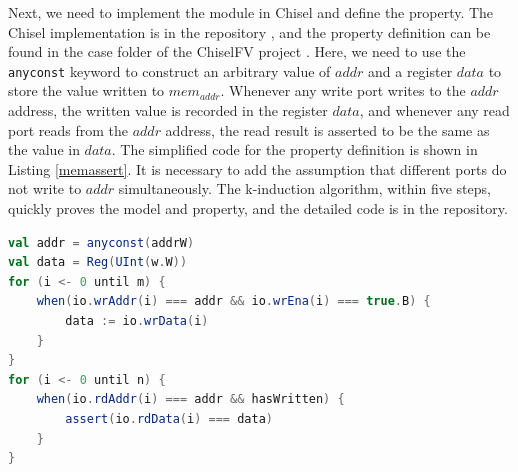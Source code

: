 \documentclass[conference]{IEEEtran}
\theoremstyle{definition}
\begin{document}
Next, we need to implement the module in Chisel and define the property. 
The Chisel implementation is in the repository \cite{mpMemory}, and the property definition can be found in the case folder of the ChiselFV project \cite{ChiselFV}.
Here, we need to use the \verb|anyconst| keyword to construct an arbitrary value of $addr$ and a register $data$ to store the value written to $mem_{addr}$. Whenever any write port writes to the $addr$ address, the written value is recorded in the register $data$, and whenever any read port reads from the $addr$ address, the read result is asserted to be the same as the value in $data$.
The simplified code for the property definition is shown in Listing \ref{memassert}. It is necessary to add the assumption that different ports do not write to $addr$ simultaneously.
The k-induction algorithm, within five steps, quickly proves the model and property, and the detailed code is in the repository.

\begin{lstlisting}[language=scala, caption={Verification Code of Multi-ported Memory Module}, label=memassert]
val addr = anyconst(addrW)
val data = Reg(UInt(w.W))
for (i <- 0 until m) {
    when(io.wrAddr(i) === addr && io.wrEna(i) === true.B) {
        data := io.wrData(i)
    }
}
for (i <- 0 until n) {
    when(io.rdAddr(i) === addr && hasWritten) {
        assert(io.rdData(i) === data)
    }
}
\end{lstlisting}
\end{document}
